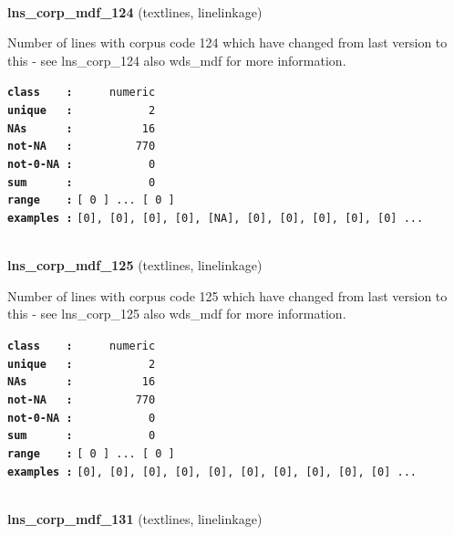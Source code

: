 \documentclass[]{article}
\begin{document}
~

\textbf{lns\_corp\_mdf\_124} (textlines, linelinkage)

Number of lines with corpus code 124 which have changed from last
version to this - see lns\_corp\_124 also wds\_mdf for more information.

\textbf{\texttt{class\ \ \ \ :}} \texttt{~~~~~numeric}\\
\textbf{\texttt{unique\ \ \ :}} \texttt{~~~~~~~~~~~2}\\
\textbf{\texttt{NAs\ \ \ \ \ \ :}} \texttt{~~~~~~~~~~16}\\
\textbf{\texttt{not-NA\ \ \ :}} \texttt{~~~~~~~~~770}\\
\textbf{\texttt{not-0-NA\ :}} \texttt{~~~~~~~~~~~0}\\
\textbf{\texttt{sum\ \ \ \ \ \ :}} \texttt{~~~~~~~~~~~0}\\
\textbf{\texttt{range\ \ \ \ :}}
\texttt{{[}\ 0\ {]}\ ...\ {[}\ 0\ {]}}\\
\textbf{\texttt{examples\ :}}
\texttt{{[}0{]},\ {[}0{]},\ {[}0{]},\ {[}0{]},\ {[}NA{]},\ {[}0{]},\ {[}0{]},\ {[}0{]},\ {[}0{]},\ {[}0{]}\ ...}\\

~

\textbf{lns\_corp\_mdf\_125} (textlines, linelinkage)

Number of lines with corpus code 125 which have changed from last
version to this - see lns\_corp\_125 also wds\_mdf for more information.

\textbf{\texttt{class\ \ \ \ :}} \texttt{~~~~~numeric}\\
\textbf{\texttt{unique\ \ \ :}} \texttt{~~~~~~~~~~~2}\\
\textbf{\texttt{NAs\ \ \ \ \ \ :}} \texttt{~~~~~~~~~~16}\\
\textbf{\texttt{not-NA\ \ \ :}} \texttt{~~~~~~~~~770}\\
\textbf{\texttt{not-0-NA\ :}} \texttt{~~~~~~~~~~~0}\\
\textbf{\texttt{sum\ \ \ \ \ \ :}} \texttt{~~~~~~~~~~~0}\\
\textbf{\texttt{range\ \ \ \ :}}
\texttt{{[}\ 0\ {]}\ ...\ {[}\ 0\ {]}}\\
\textbf{\texttt{examples\ :}}
\texttt{{[}0{]},\ {[}0{]},\ {[}0{]},\ {[}0{]},\ {[}0{]},\ {[}0{]},\ {[}0{]},\ {[}0{]},\ {[}0{]},\ {[}0{]}\ ...}\\

~

\textbf{lns\_corp\_mdf\_131} (textlines, linelinkage)
\end{document}
